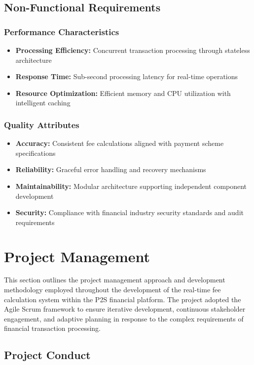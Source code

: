 \subsection{Non-Functional Requirements}

\subsubsection{Performance Characteristics}
\begin{itemize}
    \item \textbf{Processing Efficiency:} Concurrent transaction processing through stateless architecture
    \item \textbf{Response Time:} Sub-second processing latency for real-time operations
    \item \textbf{Resource Optimization:} Efficient memory and CPU utilization with intelligent caching
\end{itemize}

\subsubsection{Quality Attributes}
\begin{itemize}
    \item \textbf{Accuracy:} Consistent fee calculations aligned with payment scheme specifications
    \item \textbf{Reliability:} Graceful error handling and recovery mechanisms
    \item \textbf{Maintainability:} Modular architecture supporting independent component development
    \item \textbf{Security:} Compliance with financial industry security standards and audit requirements
\end{itemize}
\section{Project Management}

This section outlines the project management approach and development methodology employed throughout the development of the real-time fee calculation system within the P2S financial platform. The project adopted the Agile Scrum framework to ensure iterative development, continuous stakeholder engagement, and adaptive planning in response to the complex requirements of financial transaction processing.

\subsection{Project Conduct}

